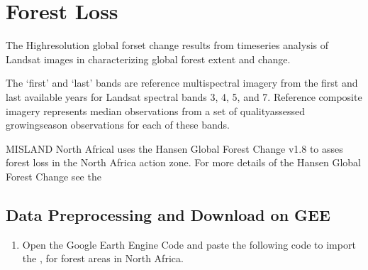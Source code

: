 \documentclass[letterpaper,10pt,english]{sphinxmanual}
\begin{document}
\sphinxstepscope


\chapter{Forest Loss}
\label{\detokenize{Preprocessing/Forestloss:forest-loss}}\label{\detokenize{Preprocessing/Forestloss::doc}}
\sphinxAtStartPar
The High\sphinxhyphen{}resolution global forset change results from time\sphinxhyphen{}series analysis of Landsat images in characterizing global forest extent and change.

\sphinxAtStartPar
The ‘first’ and ‘last’ bands are reference multispectral imagery from the first and last available years for Landsat spectral bands 3, 4, 5, and 7. Reference composite imagery represents median observations from a set of quality\sphinxhyphen{}assessed growing\sphinxhyphen{}season observations for each of these bands.

\sphinxAtStartPar
MISLAND North Africal uses the Hansen Global Forest Change v1.8 to asses forest loss in the North Africa action zone. For more details of the Hansen Global Forest Change see the 


\section{Data Preprocessing and Download on GEE}
\label{\detokenize{Preprocessing/Forestloss:data-preprocessing-and-download-on-gee}}\begin{enumerate}
%
\item {} 
\sphinxAtStartPar
Open the \label{\detokenize{Preprocessing/Forestloss:google-earth-engine-code}}Google Earth Engine Code and paste the following code to import the ,  for forest areas in North Africa.

\end{enumerate}
\end{document}
